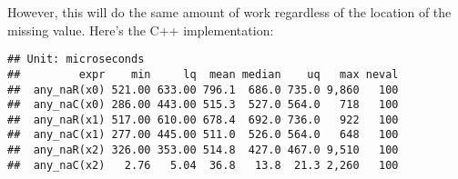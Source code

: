 \begin{Shaded}
\begin{Highlighting}[]
\StringTok{ }\NormalTok{(}
\end{Highlighting}
\end{Shaded}

However, this will do the same amount of work regardless of the location
of the missing value. Here's the C++ implementation:

\begin{Shaded}
\begin{Highlighting}[]
 

\NormalTok{\}}
\end{Highlighting}
\end{Shaded}

\begin{Shaded}
\begin{Highlighting}[]
\StringTok{ }\NormalTok{(}\NormalTok{)}
\StringTok{ }\NormalTok{)}
\StringTok{ }\NormalTok{(}

\NormalTok{(}
\NormalTok{)}
\end{Highlighting}
\end{Shaded}

\begin{verbatim}
## Unit: microseconds
##         expr    min     lq  mean median    uq   max neval
##  any_naR(x0) 521.00 633.00 796.1  686.0 735.0 9,860   100
##  any_naC(x0) 286.00 443.00 515.3  527.0 564.0   718   100
##  any_naR(x1) 517.00 610.00 678.4  692.0 736.0   922   100
##  any_naC(x1) 277.00 445.00 511.0  526.0 564.0   648   100
##  any_naR(x2) 326.00 353.00 514.8  427.0 467.0 9,510   100
##  any_naC(x2)   2.76   5.04  36.8   13.8  21.3 2,260   100
\end{verbatim}

